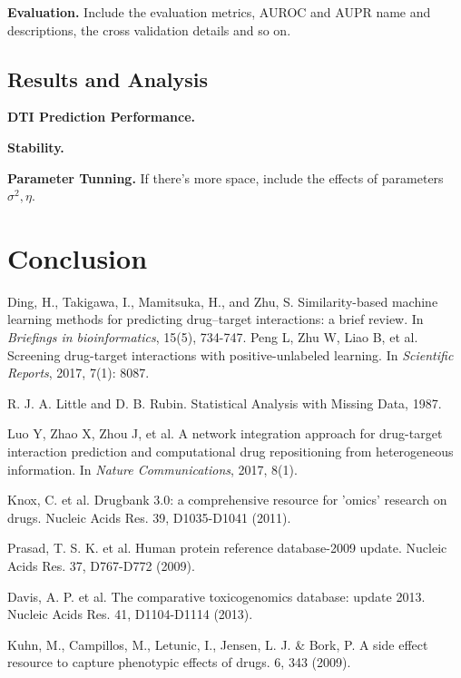 \documentclass[sigconf,anonymous]{acmart}
\begin{document}
\textbf{Evaluation.} Include the evaluation metrics, AUROC and AUPR name and descriptions, the cross validation details and so on.

\subsection{Results and Analysis}
\textbf{DTI Prediction Performance.}

\textbf{Stability.}

\textbf{Parameter Tunning.} If there's more space, include the effects of parameters $\sigma^2,\eta$. 

\section{Conclusion}\label{sec:conclusion}


\begin{thebibliography}{10}
Ding, H., Takigawa, I., Mamitsuka, H., and Zhu, S. 
\newblock Similarity-based machine learning methods for predicting drug–target interactions: a brief review. \newblock In {\em Briefings in bioinformatics}, 15(5), 734-747.
Peng L, Zhu W, Liao B, et al. 
\newblock Screening drug-target interactions with positive-unlabeled learning. 
\newblock In {\em Scientific Reports}, 2017, 7(1): 8087.

R. J. A. Little and D. B. Rubin. 
\newblock Statistical Analysis with Missing Data, 1987.

Luo Y, Zhao X, Zhou J, et al. 
\newblock A network integration approach for drug-target interaction prediction and computational drug repositioning from heterogeneous information. 
\newblock In {\em Nature Communications}, 2017, 8(1).

Knox, C. et al. Drugbank 3.0: a comprehensive resource for 'omics' research on drugs. Nucleic Acids Res. 39, D1035-D1041 (2011).

Prasad, T. S. K. et al. Human protein reference database-2009 update. Nucleic Acids Res. 37, D767-D772 (2009).

Davis, A. P. et al. The comparative toxicogenomics database: update 2013. Nucleic Acids Res. 41, D1104-D1114 (2013).

Kuhn, M., Campillos, M., Letunic, I., Jensen, L. J. & Bork, P. A side effect resource to capture phenotypic effects of drugs. 6, 343 (2009).
\end{thebibliography}
\end{document}
